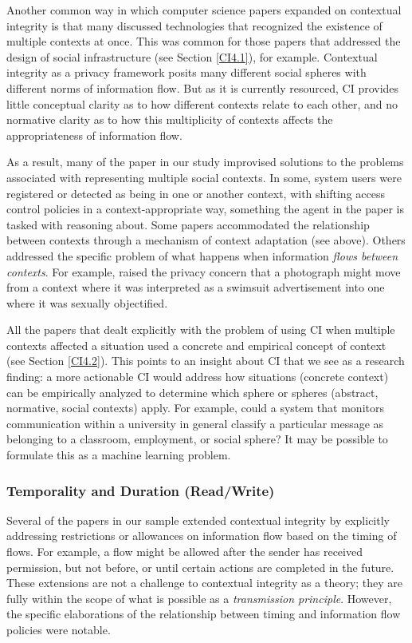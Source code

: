\documentclass[../thesis.tex]{subfiles}
\begin{document}
Another common way in which computer science papers expanded on
contextual integrity is that many discussed technologies that
recognized the existence of multiple contexts at once. This was common
for those papers that addressed the design of social infrastructure
(see Section \ref{CI4.1}), for example.
Contextual integrity as a privacy
framework posits many different social spheres with different norms of
information flow. But as it is currently resourced, CI provides little
conceptual clarity as to how different contexts relate to each other,
and no normative clarity as to how this multiplicity of contexts
affects the appropriateness of information flow.

As a result, many of the paper in our study improvised solutions to the
problems associated with representing multiple social contexts. In
some, system users were registered or detected as being in one or
another context, with shifting access control policies in a
context-appropriate way, something the agent in the
\citet{criado2015implicit} paper is tasked with reasoning about.
Some papers accommodated
the relationship between contexts through a mechanism of context
adaptation (see above). Others addressed the specific problem of what
happens when information \textit{flows between contexts}. For example,
\citet{sayaf2014mathrm} raised the privacy concern that a photograph might
move from a context where it was interpreted as a swimsuit
advertisement into one where it was sexually objectified. 

All the papers that dealt explicitly with the problem of using CI when
multiple contexts affected a situation used a concrete and empirical
concept of context (see Section \ref{CI4.2}).
This points to an insight about CI that we see as a research finding:
a more actionable CI would address how situations (concrete context)
can be empirically analyzed to determine which sphere or spheres
(abstract, normative, social contexts) apply. For example, could a
system that monitors communication within a university in general
classify a particular message as belonging to a classroom, employment,
or social sphere? It may be possible to formulate this as a machine
learning problem.

\subsubsection{Temporality and Duration (Read/Write)}
\label{CI4.4.3}

Several of the papers in our sample extended contextual integrity by
explicitly addressing restrictions or allowances on information flow
based on the timing of flows. For example, a flow might be allowed
after the sender has received permission, but not before, or until
certain actions are completed in the future. These extensions are not a
challenge to contextual integrity as a theory; they are fully within
the scope of what is possible as a \textit{transmission principle}.
However, the specific elaborations of the relationship between timing
and information flow policies were notable.
\end{document}
